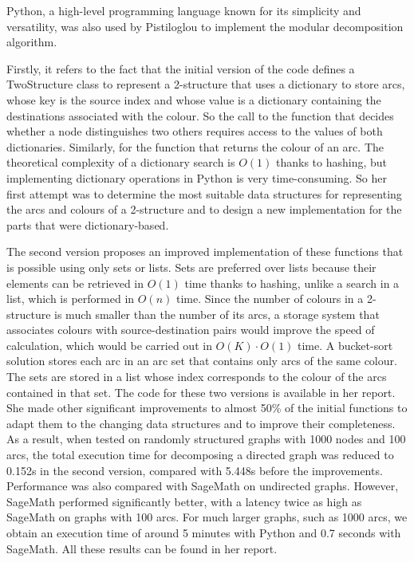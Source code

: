 Python, a high-level programming language known for its simplicity and versatility, was also used by Pistiloglou to implement the modular decomposition algorithm.

Firstly, it refers to the fact that the initial version of the code defines a TwoStructure class to represent a 2-structure that uses a dictionary to store arcs, whose key is the source index and whose value is a dictionary containing the destinations associated with the colour.
So the call to the function that decides whether a node distinguishes two others requires access to the values of both dictionaries.
Similarly, for the function that returns the colour of an arc.
The theoretical complexity of a dictionary search is $O(1)$ thanks to hashing, but implementing dictionary operations in Python is very time-consuming.
So her first attempt was to determine the most suitable data structures for representing the arcs and colours of a 2-structure and to design a new implementation for the parts that were dictionary-based.

The second version proposes an improved implementation of these functions that is possible using only sets or lists.
Sets are preferred over lists because their elements can be retrieved in $O(1)$ time thanks to hashing, unlike a search in a list, which is performed in $O(n)$ time.
Since the number of colours in a 2-structure is much smaller than the number of its arcs, a storage system that associates colours with source-destination pairs would improve the speed of calculation, which would be carried out in $O(K) \cdot O(1)$ time.
A bucket-sort solution stores each arc in an arc set that contains only arcs of the same colour.
The sets are stored in a list whose index corresponds to the colour of the arcs contained in that set.
The code for these two versions is available in her report.
She made other significant improvements to almost 50\% of the initial functions to adapt them to the changing data structures and to improve their completeness.
As a result, when tested on randomly structured graphs with 1000 nodes and 100 arcs, the total execution time for decomposing a directed graph was reduced to 0.152s in the second version, compared with 5.448s before the improvements.
Performance was also compared with SageMath on undirected graphs.
However, SageMath performed significantly better, with a latency twice as high as SageMath on graphs with 100 arcs.
For much larger graphs, such as 1000 arcs, we obtain an execution time of around 5 minutes with Python and 0.7 seconds with SageMath.
All these results can be found in her report.



